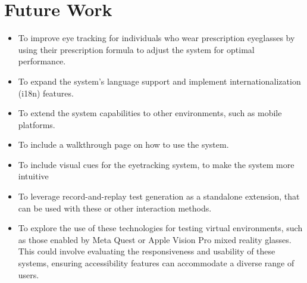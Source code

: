 \section{Future Work}

\begin{itemize}
    \item To improve eye tracking for individuals who wear prescription eyeglasses by using their prescription formula to adjust the system for optimal performance.
    \item To expand the system's language support and implement internationalization (i18n) features.
    \item To extend the system capabilities to other environments, such as mobile platforms.
    \item To include a walkthrough page on how to use the system.
    \item To include visual cues for the eyetracking system, to make the system more intuitive
    \item To leverage record-and-replay test generation as a standalone extension, that can be used with these or other interaction methods.
    \item To explore the use of these technologies for testing virtual environments, such as those enabled by Meta Quest or Apple Vision Pro mixed reality glasses. This could involve evaluating the responsiveness and usability of these systems, ensuring accessibility features can accommodate a diverse range of users. 
\end{itemize}
